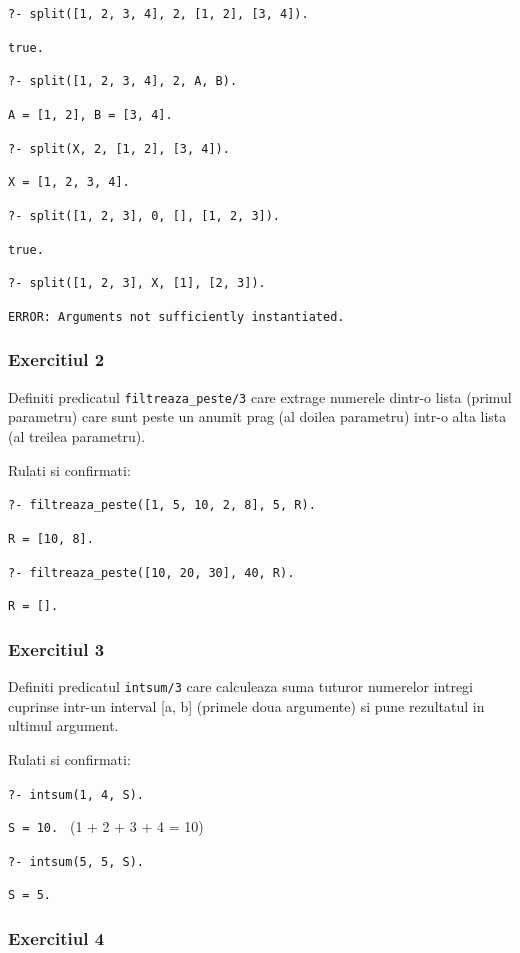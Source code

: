 \texttt{?- split([1, 2, 3, 4], 2, [1, 2], [3, 4]).}

\texttt{true.}

\texttt{?- split([1, 2, 3, 4], 2, A, B).}

\texttt{A = [1, 2], B = [3, 4].}

\texttt{?- split(X, 2, [1, 2], [3, 4]).}

\texttt{X = [1, 2, 3, 4].}

\texttt{?- split([1, 2, 3], 0, [], [1, 2, 3]).}

\texttt{true.}

\texttt{?- split([1, 2, 3], X, [1], [2, 3]).}

\texttt{ERROR: Arguments not sufficiently instantiated.}




\subsubsection*{Exercitiul 2}

Definiti predicatul \texttt{filtreaza\_peste/3} care extrage numerele dintr-o lista (primul parametru) care sunt peste un anumit prag (al doilea parametru) intr-o alta lista (al treilea parametru).

Rulati si confirmati:

\texttt{?- filtreaza\_peste([1, 5, 10, 2, 8], 5, R).}

\texttt{R = [10, 8].}

\texttt{?- filtreaza\_peste([10, 20, 30], 40, R).}

\texttt{R = [].}




\subsubsection*{Exercitiul 3}

Definiti predicatul \texttt{intsum/3} care calculeaza suma tuturor numerelor intregi cuprinse intr-un interval [a, b] (primele doua argumente) si pune rezultatul in ultimul argument.

Rulati si confirmati:

\texttt{?- intsum(1, 4, S).}

\texttt{S = 10. } (1 + 2 + 3 + 4 = 10)

\texttt{?- intsum(5, 5, S).}

\texttt{S = 5.}



\subsubsection*{Exercitiul 4}

